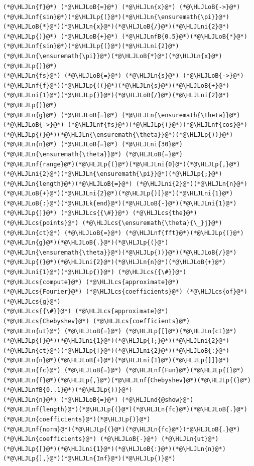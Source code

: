 \documentclass[12pt,a4paper]{article}
\newcommand{\HLJLk}[1]{\textcolor[RGB]{148,91,176}{\textbf{#1}}}
\newcommand{\HLJLn}[1]{#1}
\newcommand{\HLJLnd}[1]{\textcolor[RGB]{214,102,97}{#1}}
\newcommand{\HLJLnf}[1]{\textcolor[RGB]{66,102,213}{#1}}
\newcommand{\HLJLnfB}[1]{\textcolor[RGB]{59,151,46}{#1}}
\newcommand{\HLJLni}[1]{\textcolor[RGB]{59,151,46}{#1}}
\newcommand{\HLJLoB}[1]{\textcolor[RGB]{102,102,102}{\textbf{#1}}}
\newcommand{\HLJLp}[1]{#1}
\newcommand{\HLJLcs}[1]{\textcolor[RGB]{153,153,119}{\textit{#1}}}
\begin{document}
\begin{lstlisting}
(*@\HLJLn{f}@*) (*@\HLJLoB{=}@*) (*@\HLJLn{x}@*) (*@\HLJLoB{->}@*) (*@\HLJLnf{sin}@*)(*@\HLJLp{(}@*)(*@\HLJLn{\ensuremath{\pi}}@*)(*@\HLJLoB{*}@*)(*@\HLJLn{x}@*)(*@\HLJLoB{/}@*)(*@\HLJLni{2}@*)(*@\HLJLp{)}@*) (*@\HLJLoB{+}@*) (*@\HLJLnfB{0.5}@*)(*@\HLJLoB{*}@*)(*@\HLJLnf{sin}@*)(*@\HLJLp{(}@*)(*@\HLJLni{2}@*)(*@\HLJLn{\ensuremath{\pi}}@*)(*@\HLJLoB{*}@*)(*@\HLJLn{x}@*)(*@\HLJLp{)}@*)
(*@\HLJLn{fs}@*) (*@\HLJLoB{=}@*) (*@\HLJLn{s}@*) (*@\HLJLoB{->}@*) (*@\HLJLnf{f}@*)(*@\HLJLp{((}@*)(*@\HLJLn{s}@*)(*@\HLJLoB{+}@*)(*@\HLJLni{1}@*)(*@\HLJLp{)}@*)(*@\HLJLoB{/}@*)(*@\HLJLni{2}@*)(*@\HLJLp{)}@*)
(*@\HLJLn{g}@*) (*@\HLJLoB{=}@*) (*@\HLJLn{\ensuremath{\theta}}@*) (*@\HLJLoB{->}@*) (*@\HLJLnf{fs}@*)(*@\HLJLp{(}@*)(*@\HLJLnf{cos}@*)(*@\HLJLp{(}@*)(*@\HLJLn{\ensuremath{\theta}}@*)(*@\HLJLp{))}@*)
(*@\HLJLn{n}@*) (*@\HLJLoB{=}@*) (*@\HLJLni{30}@*)
(*@\HLJLn{\ensuremath{\theta}}@*) (*@\HLJLoB{=}@*) (*@\HLJLnf{range}@*)(*@\HLJLp{(}@*)(*@\HLJLni{0}@*)(*@\HLJLp{,}@*)(*@\HLJLni{2}@*)(*@\HLJLn{\ensuremath{\pi}}@*)(*@\HLJLp{;}@*)(*@\HLJLn{length}@*)(*@\HLJLoB{=}@*) (*@\HLJLni{2}@*)(*@\HLJLn{n}@*)(*@\HLJLoB{+}@*)(*@\HLJLni{2}@*)(*@\HLJLp{)[}@*)(*@\HLJLni{1}@*)(*@\HLJLoB{:}@*)(*@\HLJLk{end}@*)(*@\HLJLoB{-}@*)(*@\HLJLni{1}@*)(*@\HLJLp{]}@*) (*@\HLJLcs{{\#}}@*) (*@\HLJLcs{the}@*) (*@\HLJLcs{points}@*) (*@\HLJLcs{\ensuremath{\theta}{\_}j}@*)
(*@\HLJLn{ct}@*) (*@\HLJLoB{=}@*) (*@\HLJLnf{fft}@*)(*@\HLJLp{(}@*)(*@\HLJLn{g}@*)(*@\HLJLoB{.}@*)(*@\HLJLp{(}@*)(*@\HLJLn{\ensuremath{\theta}}@*)(*@\HLJLp{))}@*)(*@\HLJLoB{/}@*)(*@\HLJLp{(}@*)(*@\HLJLni{2}@*)(*@\HLJLn{n}@*)(*@\HLJLoB{+}@*)(*@\HLJLni{1}@*)(*@\HLJLp{)}@*) (*@\HLJLcs{{\#}}@*) (*@\HLJLcs{compute}@*) (*@\HLJLcs{approximate}@*) (*@\HLJLcs{Fourier}@*) (*@\HLJLcs{coefficients}@*) (*@\HLJLcs{of}@*) (*@\HLJLcs{g}@*)
(*@\HLJLcs{{\#}}@*) (*@\HLJLcs{approximate}@*) (*@\HLJLcs{Chebyshev}@*) (*@\HLJLcs{coefficients}@*)
(*@\HLJLn{ut}@*) (*@\HLJLoB{=}@*) (*@\HLJLp{[}@*)(*@\HLJLn{ct}@*)(*@\HLJLp{[}@*)(*@\HLJLni{1}@*)(*@\HLJLp{];}@*)(*@\HLJLni{2}@*)(*@\HLJLn{ct}@*)(*@\HLJLp{[}@*)(*@\HLJLni{2}@*)(*@\HLJLoB{:}@*)(*@\HLJLn{n}@*)(*@\HLJLoB{+}@*)(*@\HLJLni{1}@*)(*@\HLJLp{]]}@*) 
(*@\HLJLn{fc}@*) (*@\HLJLoB{=}@*) (*@\HLJLnf{Fun}@*)(*@\HLJLp{(}@*)(*@\HLJLn{f}@*)(*@\HLJLp{,}@*)(*@\HLJLnf{Chebyshev}@*)(*@\HLJLp{(}@*)(*@\HLJLnfB{0..1}@*)(*@\HLJLp{))}@*)
(*@\HLJLn{n}@*) (*@\HLJLoB{=}@*) (*@\HLJLnd{@show}@*) (*@\HLJLnf{length}@*)(*@\HLJLp{(}@*)(*@\HLJLn{fc}@*)(*@\HLJLoB{.}@*)(*@\HLJLn{coefficients}@*)(*@\HLJLp{)}@*)
(*@\HLJLnf{norm}@*)(*@\HLJLp{(}@*)(*@\HLJLn{fc}@*)(*@\HLJLoB{.}@*)(*@\HLJLn{coefficients}@*) (*@\HLJLoB{-}@*) (*@\HLJLn{ut}@*)(*@\HLJLp{[}@*)(*@\HLJLni{1}@*)(*@\HLJLoB{:}@*)(*@\HLJLn{n}@*)(*@\HLJLp{],}@*)(*@\HLJLn{Inf}@*)(*@\HLJLp{)}@*)
\end{lstlisting}
\end{document}
